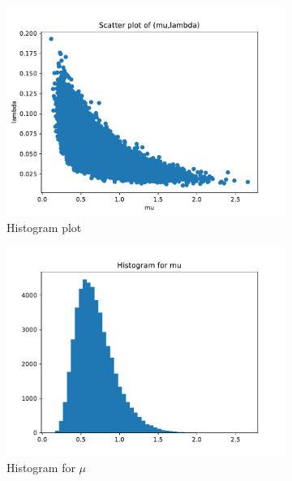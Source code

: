 \documentclass{homeworg}
\begin{document}
\begin{figure}[h]
	\centering
	\begin{subfigure}[b]{0.52\textwidth}
		\centering
		\includegraphics[width=\textwidth]{q2_partc_scatter.pdf}
		\caption{Histogram plot}
	\end{subfigure}
	\hfill
	\begin{subfigure}[b]{0.48\textwidth}
		\centering
		\includegraphics[width=\textwidth]{q2_partc_hist_mu.pdf}
		\caption{Histogram for $\mu$}
	\end{subfigure}
	\begin{subfigure}[b]{0.48\textwidth}
	\centering

\end{subfigure}
\end{figure}
\end{document}
